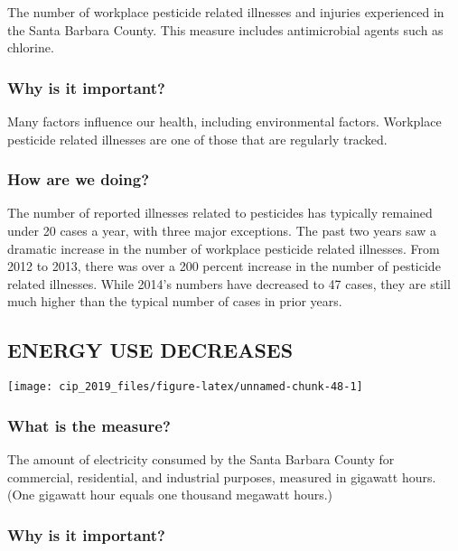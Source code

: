 \documentclass[]{book}
\theoremstyle{definition}
\theoremstyle{definition}
\theoremstyle{definition}
\theoremstyle{remark}
\begin{document}
The number of workplace pesticide related illnesses and injuries
experienced in the Santa Barbara County. This measure includes
antimicrobial agents such as chlorine.

\subsubsection*{Why is it important?}\label{why-is-it-important-21}

Many factors influence our health, including environmental factors.
Workplace pesticide related illnesses are one of those that are
regularly tracked.

\subsubsection*{How are we doing?}\label{how-are-we-doing-28}

The number of reported illnesses related to pesticides has typically
remained under 20 cases a year, with three major exceptions. The past
two years saw a dramatic increase in the number of workplace pesticide
related illnesses. From 2012 to 2013, there was over a 200 percent
increase in the number of pesticide related illnesses. While 2014's
numbers have decreased to 47 cases, they are still much higher than the
typical number of cases in prior years.

\subsection*{ENERGY USE DECREASES}\label{energy-use-decreases}

\texttt{[image: cip\_2019\_files/figure-latex/unnamed-chunk-48-1]}

\subsubsection*{What is the measure?}\label{what-is-the-measure-23}

The amount of electricity consumed by the Santa Barbara County for
commercial, residential, and industrial purposes, measured in gigawatt
hours. (One gigawatt hour equals one thousand megawatt hours.)

\subsubsection*{Why is it important?}\label{why-is-it-important-22}
\end{document}
